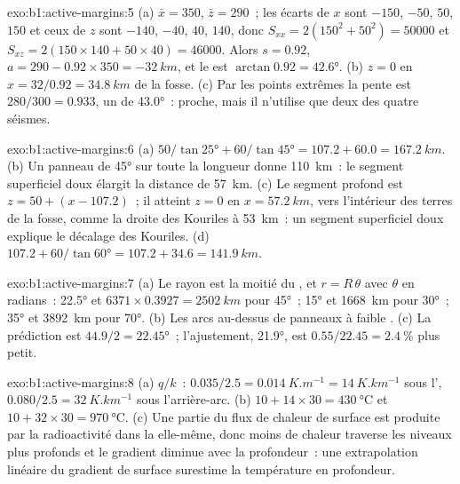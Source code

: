 \begin{solution}{exo:b1:active-margins:5}
(a) $\bar x = 350$, $\bar z = 290$~; les écarts de $x$ sont $-150$, $-50$,
$50$, $150$ et ceux de $z$ sont $-140$, $-40$, $40$, $140$, donc
$S_{xx} = 2(150^2 + 50^2) = \num{50000}$ et
$S_{xz} = 2(150\times140 + 50\times40) = \num{46000}$. Alors $s = 0.92$,
$a = 290 - 0.92\times350 = \qty{-32}{km}$, et le  est
$\arctan 0.92 = \ang{42.6}$. (b) $z = 0$ en $x = 32/0.92 = \qty{34.8}{km}$
de la fosse. (c) Par les points extrêmes la pente est $280/300 = 0.933$, un
 de \ang{43.0}~: proche, mais il n'utilise que deux des quatre séismes.
\end{solution}

\begin{solution}{exo:b1:active-margins:6}
(a) $50/\tan\ang{25} + 60/\tan\ang{45} = 107.2 + 60.0 = \qty{167.2}{km}$.
(b) Un panneau de \ang{45} sur toute la longueur donne \qty{110}{km}~: le segment
superficiel doux élargit la distance de \qty{57}{km}. (c) Le segment profond est
$z = 50 + (x - 107.2)$~; il atteint $z = 0$ en $x = \qty{57.2}{km}$, vers l'intérieur des terres de
la fosse, comme la droite des Kouriles à \qty{53}{km}~: un segment superficiel doux
explique le décalage des Kouriles. (d) $107.2 + 60/\tan\ang{60} = 107.2 + 34.6 =
\qty{141.9}{km}$.
\end{solution}

\begin{solution}{exo:b1:active-margins:7}
(a) Le rayon est la moitié du , et $r = R\,\theta$ avec $\theta$ en radians~:
\ang{22.5} et $6371\times0.3927 = \qty{2502}{km}$ pour \ang{45}~; \ang{15} et
\qty{1668}{km} pour \ang{30}~; \ang{35} et \qty{3892}{km} pour \ang{70}.
(b) Les arcs au-dessus de panneaux à faible . (c) La prédiction est
$44.9/2 = \ang{22.45}$~; l'ajustement, \ang{21.9}, est
$0.55/22.45 = \qty{2.4}{\percent}$ plus petit.
\end{solution}

\begin{solution}{exo:b1:active-margins:8}
(a) $q/k$~: $0.035/2.5 = \qty{0.014}{K.m^{-1}} = \qty{14}{K.km^{-1}}$ sous
l', $0.080/2.5 = \qty{32}{K.km^{-1}}$ sous l'arrière-arc.
(b) $10 + 14\times30 = \qty{430}{\celsius}$ et
$10 + 32\times30 = \qty{970}{\celsius}$. (c) Une partie du flux de chaleur de surface est
produite par la radioactivité dans la  elle-même, donc moins de chaleur traverse les
niveaux plus profonds et le gradient diminue avec la profondeur~: une extrapolation linéaire du
gradient de surface surestime la température en profondeur.
\end{solution}

